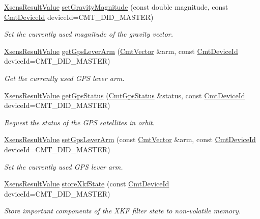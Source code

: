 \begin{DoxyCompactItemize}
\hyperlink{group__enums_ga822a2260a20af524029eef9e9a51ff6f}{\-Xsens\-Result\-Value} \hyperlink{classxsens_1_1Cmt3_ae484ba95c37129361811a3dd67158c43}{set\-Gravity\-Magnitude} (const double magnitude, const \hyperlink{cmtdef_8h_a2e3b6a17360828d440ee848959918af2}{\-Cmt\-Device\-Id} device\-Id=\-C\-M\-T\-\_\-\-D\-I\-D\-\_\-\-M\-A\-S\-T\-E\-R)
\begin{DoxyCompactList}\small\item\em \-Set the currently used magnitude of the gravity vector. \end{DoxyCompactList}\item 
\hyperlink{group__enums_ga822a2260a20af524029eef9e9a51ff6f}{\-Xsens\-Result\-Value} \hyperlink{classxsens_1_1Cmt3_acdb10df205ca6486f0d21621883f2791}{get\-Gps\-Lever\-Arm} (\hyperlink{structCmtVector}{\-Cmt\-Vector} \&arm, const \hyperlink{cmtdef_8h_a2e3b6a17360828d440ee848959918af2}{\-Cmt\-Device\-Id} device\-Id=\-C\-M\-T\-\_\-\-D\-I\-D\-\_\-\-M\-A\-S\-T\-E\-R)
\begin{DoxyCompactList}\small\item\em \-Get the currently used \-G\-P\-S lever arm. \end{DoxyCompactList}\item 
\hyperlink{group__enums_ga822a2260a20af524029eef9e9a51ff6f}{\-Xsens\-Result\-Value} \hyperlink{classxsens_1_1Cmt3_aaf0bc33d70e05e2c03cf708779f03423}{get\-Gps\-Status} (\hyperlink{structCmtGpsStatus}{\-Cmt\-Gps\-Status} \&status, const \hyperlink{cmtdef_8h_a2e3b6a17360828d440ee848959918af2}{\-Cmt\-Device\-Id} device\-Id=\-C\-M\-T\-\_\-\-D\-I\-D\-\_\-\-M\-A\-S\-T\-E\-R)
\begin{DoxyCompactList}\small\item\em \-Request the status of the \-G\-P\-S satellites in orbit. \end{DoxyCompactList}\item 
\hyperlink{group__enums_ga822a2260a20af524029eef9e9a51ff6f}{\-Xsens\-Result\-Value} \hyperlink{classxsens_1_1Cmt3_a5375fc40b0e7623df77fd85762f3dc19}{set\-Gps\-Lever\-Arm} (const \hyperlink{structCmtVector}{\-Cmt\-Vector} \&arm, const \hyperlink{cmtdef_8h_a2e3b6a17360828d440ee848959918af2}{\-Cmt\-Device\-Id} device\-Id=\-C\-M\-T\-\_\-\-D\-I\-D\-\_\-\-M\-A\-S\-T\-E\-R)
\begin{DoxyCompactList}\small\item\em \-Set the currently used \-G\-P\-S lever arm. \end{DoxyCompactList}\item 
\hyperlink{group__enums_ga822a2260a20af524029eef9e9a51ff6f}{\-Xsens\-Result\-Value} \hyperlink{classxsens_1_1Cmt3_a156e28148d2f53d584534367eff0cc41}{store\-Xkf\-State} (const \hyperlink{cmtdef_8h_a2e3b6a17360828d440ee848959918af2}{\-Cmt\-Device\-Id} device\-Id=\-C\-M\-T\-\_\-\-D\-I\-D\-\_\-\-M\-A\-S\-T\-E\-R)
\begin{DoxyCompactList}\small\item\em \-Store important components of the \-X\-K\-F filter state to non-\/volatile memory. \end{DoxyCompactList}\end{DoxyCompactItemize}
